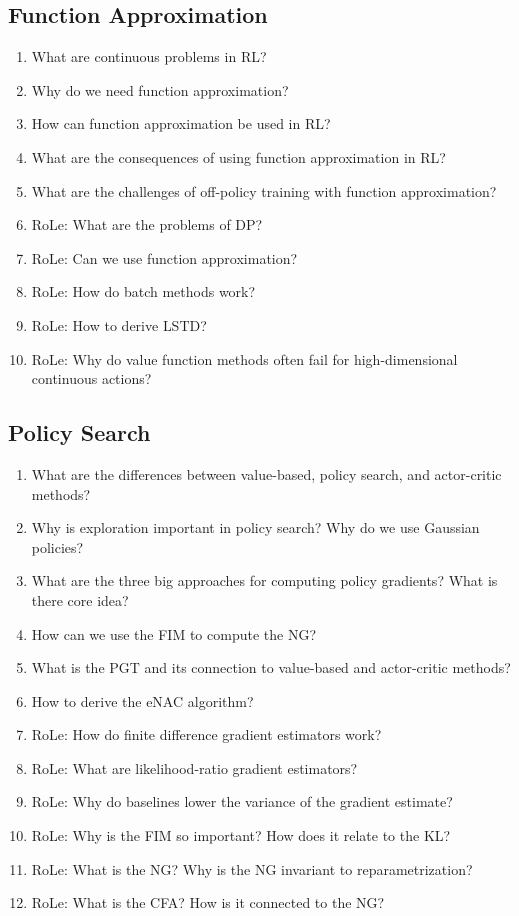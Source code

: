 		\subsection{Function Approximation}
			\begin{enumerate}
				\item What are continuous problems in \ac{RL}?
				\item Why do we need function approximation?
				\item How can function approximation be used in \ac{RL}?
				\item What are the consequences of using function approximation in \ac{RL}?
				\item What are the challenges of off-policy training with function approximation?
				\item RoLe: What are the problems of \ac{DP}?
				\item RoLe: Can we use function approximation?
				\item RoLe: How do batch methods work?
				\item RoLe: How to derive \ac{LSTD}?
				\item RoLe: Why do value function methods often fail for high-dimensional continuous actions?
			\end{enumerate}

		\subsection{Policy Search}
			\begin{enumerate}
				\item What are the differences between value-based, policy search, and actor-critic methods?
				\item Why is exploration important in policy search? Why do we use Gaussian policies?
				\item What are the three big approaches for computing policy gradients? What is there core idea?
				\item How can we use the \ac{FIM} to compute the \ac{NG}?
				\item What is the \ac{PGT} and its connection to value-based and actor-critic methods?
				\item How to derive the \ac{eNAC} algorithm?
				\item RoLe: How do finite difference gradient estimators work?
				\item RoLe: What are likelihood-ratio gradient estimators?
				\item RoLe: Why do baselines lower the variance of the gradient estimate?
				\item RoLe: Why is the \ac{FIM} so important? How does it relate to the \ac{KL}?
				\item RoLe: What is the \ac{NG}? Why is the \ac{NG} invariant to reparametrization?
				\item RoLe: What is the \ac{CFA}? How is it connected to the \ac{NG}?
			\end{enumerate}

